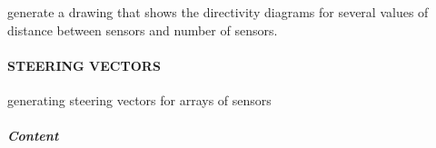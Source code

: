 \documentclass[letterpaper,10pt,english]{sphinxmanual}
\begin{document}

\begin{fulllineitems}
\label{reference/spatial:pyfasst.spatial.dirdiag.producePicDiagramAgainstDistNSensors}
generate a drawing that shows the directivity diagrams for
several values of distance between sensors and number of sensors.

\end{fulllineitems}

\label{reference/spatial:module-pyfasst.spatial.steering_vectors}

\paragraph{STEERING VECTORS}
\label{reference/spatial:steering-vectors}
generating steering vectors for arrays of sensors


\subparagraph{Content}
\label{reference/spatial:content}
\end{document}
